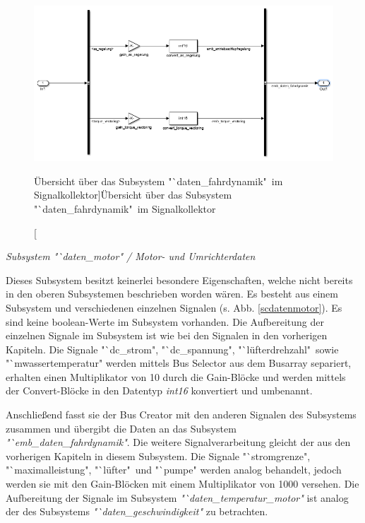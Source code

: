 \documentclass[fontsize = 12pt, paper = a4]{scrreprt}
\begin{document}
\begin{figure}[h]
\centering
\includegraphics[scale = 0.75]{sc_daten_fahrdynamik}
\caption[Übersicht über das Subsystem "`daten\_fahrdynamik"\ im Signalkollektor]{Übersicht über das Subsystem "`daten\_fahrdynamik"\ im Signalkollektor}
\label{scdatenfahrdynamik}
\end{figure}


\textit {Subsystem "`daten\_motor" / Motor- und Umrichterdaten}

Dieses Subsystem besitzt keinerlei besondere Eigenschaften, welche nicht bereits in den oberen Subsystemen beschrieben worden wären. Es besteht aus einem Subsystem und verschiedenen einzelnen Signalen (s. Abb. \ref{scdatenmotor}). Es sind keine boolean-Werte im Subsystem vorhanden. Die Aufbereitung der einzelnen Signale im Subsystem ist wie bei den Signalen in den vorherigen Kapiteln. Die Signale "`dc\_strom", "`dc\_spannung", "`lüfterdrehzahl"\ sowie "`mwassertemperatur" werden mittels Bus Selector aus dem Busarray separiert, erhalten einen Multiplikator von 10 durch die Gain-Blöcke und werden mittels der Convert-Blöcke in den Datentyp \textit{int16} konvertiert und umbenannt.

\newpage

Anschließend fasst sie der Bus Creator mit den anderen Signalen des Subsystems zusammen und übergibt die Daten an das Subsystem \textit{"`emb\_daten\_fahrdynamik"}. Die weitere Signalverarbeitung gleicht der aus den vorherigen Kapiteln in diesem Subsystem. Die Signale "`stromgrenze", "`maximalleistung", "`lüfter"\ und "`pumpe" werden analog behandelt, jedoch werden sie mit den Gain-Blöcken mit einem Multiplikator von 1000 versehen. Die Aufbereitung der Signale im Subsystem \textit{"`daten\_temperatur\_motor" }ist analog der des Subsystems \textit{"`daten\_geschwindigkeit"} zu betrachten.
 
\end{document}
